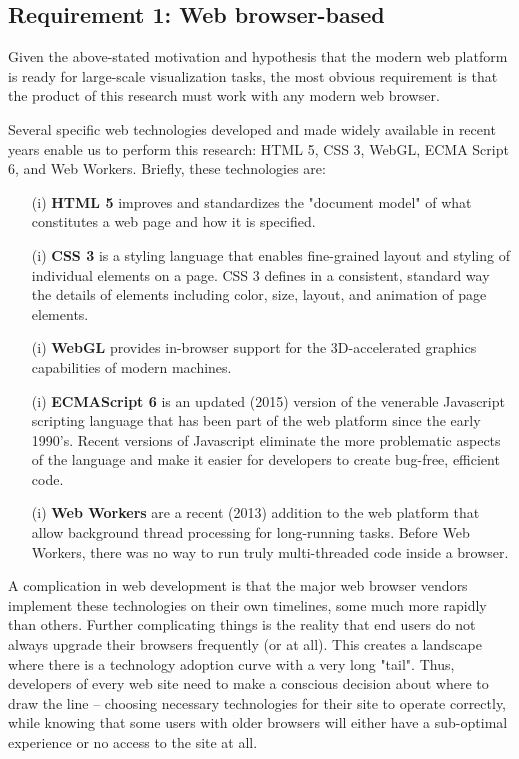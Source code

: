 \documentclass[Afour,sageh,times]{sagej}
\begin{document}
\subsection{Requirement 1: Web browser-based}

Given the above-stated motivation and hypothesis that the modern web
platform is ready for large-scale visualization tasks, the most obvious requirement is that the product of this research must work with any modern web browser.

Several specific web technologies developed and made widely available in recent years enable us to perform this research: HTML 5, CSS 3, WebGL, ECMA Script 6, and Web Workers. Briefly, these technologies are:

\begin{enumerate}

\item[(i)] \textbf{HTML 5} improves and standardizes the "document model" of what constitutes a web page and how it is specified.
\item[(i)] \textbf{CSS 3} is a styling language that enables fine-grained layout and styling of individual elements on a page. CSS 3 defines in a consistent, standard way the details of elements including color, size, layout, and animation of page elements.
\item[(i)] \textbf{WebGL} provides in-browser support for the 3D-accelerated graphics capabilities of modern machines.
\item[(i)] \textbf{ECMAScript 6} is an updated (2015) version of the venerable Javascript scripting language that has been part of the web platform since the early 1990's. Recent versions of Javascript eliminate the more problematic aspects of the language and make it easier for developers to create bug-free, efficient code.
\item[(i)] \textbf{Web Workers} are a recent (2013) addition to the web platform that allow background thread processing for long-running tasks. Before Web Workers, there was no way to run truly multi-threaded code inside a browser.

\end{enumerate}

A complication in web development is that the major web browser vendors implement these technologies on their own timelines, some much more rapidly than others. Further complicating things is the reality that end users do not always upgrade their browsers frequently (or at all). This creates a landscape where there is a technology adoption curve with a very long "tail". Thus, developers of every web site need to make a conscious decision about where to
draw the line -- choosing necessary technologies for their site to operate correctly, while knowing that some users with older browsers will either have a sub-optimal experience or no access to the site at all.
\end{document}
